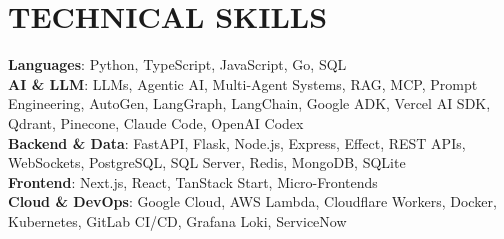 \documentclass[letterpaper,11pt]{article}
\begin{document}
\section{TECHNICAL SKILLS}
\begin{itemize}[leftmargin=0in, label={}, itemsep=0pt, parsep=0pt]
    \small{
      \item{
        \textbf{Languages}{: Python, TypeScript, JavaScript, Go, SQL}\vspace{2pt} \\
        \textbf{AI \& LLM}{: LLMs, Agentic AI, Multi-Agent Systems, RAG, MCP, Prompt Engineering, AutoGen, LangGraph, LangChain, Google ADK, Vercel AI SDK, Qdrant, Pinecone, Claude Code, OpenAI Codex}\vspace{2pt} \\
        \textbf{Backend \& Data}{: FastAPI, Flask, Node.js, Express, Effect, REST APIs, WebSockets, PostgreSQL, SQL Server, Redis, MongoDB, SQLite}\vspace{2pt} \\
        \textbf{Frontend}{: Next.js, React, TanStack Start, Micro-Frontends}\vspace{2pt} \\
        \textbf{Cloud \& DevOps}{: Google Cloud, AWS Lambda, Cloudflare Workers, Docker, Kubernetes, GitLab CI/CD, Grafana Loki, ServiceNow}
      }
    }
\end{itemize}

\end{document}
